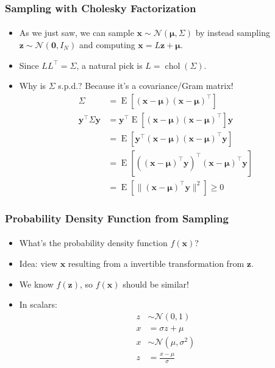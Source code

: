 \documentclass{beamer}                             %
\renewcommand{\vec}[1]{\bm{#1}}
\DeclareMathOperator{\chol}{chol}
\DeclareMathOperator{\E}{E}
\begin{document}
\begin{frame}
\frametitle{Sampling with Cholesky Factorization}
\framesubtitle{}
\begin{itemize}
  \item<+-> As we just saw, we can sample
    \( \vec{x} \sim \mathcal{N}(\vec{\mu}, \Sigma) \) by instead sampling
    \( \vec{z} \sim \mathcal{N}(\vec{0}, I_N) \) and computing
    \( \vec{x} = L \vec{z} + \vec{\mu} \).
  \item<+-> Since \( L L^{\top} = \Sigma \), a natural pick is
    \( L = \chol(\Sigma) \).
  \item<+-> Why is \( \Sigma \) s.p.d.? Because it's a covariance/Gram matrix!
    \begin{align*}
      \Sigma &= \E[(\vec{x} - \vec{\mu}) (\vec{x} - \vec{\mu})^{\top}] \\
      \vec{y}^{\top} \Sigma \vec{y}
      &= \vec{y}^{\top} \E[(\vec{x} - \vec{\mu})
                           (\vec{x} - \vec{\mu})^{\top}] \vec{y} \\
      &= \E[\vec{y}^{\top} (\vec{x} - \vec{\mu})
                           (\vec{x} - \vec{\mu})^{\top} \vec{y}] \\
      &= \E[((\vec{x} - \vec{\mu})^{\top} \vec{y})^{\top}
             (\vec{x} - \vec{\mu})^{\top} \vec{y}] \\
      &= \E[\lVert (\vec{x} - \vec{\mu})^{\top} \vec{y} \rVert^2] \geq 0
    \end{align*}
\end{itemize}
\end{frame}

\begin{frame}
\frametitle{Probability Density Function from Sampling}
\framesubtitle{}
\begin{itemize}
  \item<+-> What's the probability density function \( f(\vec{x}) \)?
  \item<+-> Idea: view \( \vec{x} \) resulting from
    a invertible transformation from \( \vec{z} \).
  \item<+-> We know \( f(\vec{z}) \), so \( f(\vec{x}) \) should be similar!
  \item<+-> In scalars:
    \begin{align*}
      z &\sim \mathcal{N}(0, 1) \\
      x &= \sigma z + \mu \\
      x &\sim \mathcal{N}(\mu, \sigma^2) \\
      z &= \frac{x - \mu}{\sigma}
    \end{align*}
\end{itemize}
\end{frame}
\end{document}
